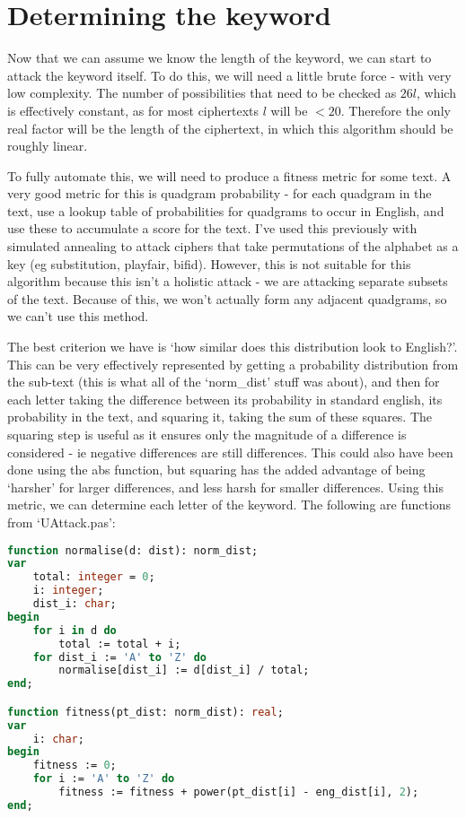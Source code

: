 \documentclass[fleqn,a4paper,11pt]{article}
\begin{document}
    \section{Determining the keyword}

    Now that we can assume we know the length of the keyword, we can start to
    attack the keyword itself. To do this, we will need a little brute force -
    with very low complexity. The number of possibilities that need to be
    checked as \(26l\), which is effectively constant, as for most ciphertexts
    \(l\) will be \(< 20\). Therefore the only real factor will be the length of
    the ciphertext, in which this algorithm should be roughly linear.

    To fully automate this, we will need to produce a fitness metric for some
    text. A very good metric for this is quadgram probability - for each
    quadgram in the text, use a lookup table of probabilities for quadgrams to
    occur in English, and use these to accumulate a score for the text. I've
    used this previously with simulated annealing to attack ciphers that take
    permutations of the alphabet as a key (eg substitution, playfair, bifid).
    However, this is not suitable for this algorithm because this isn't a
    holistic attack - we are attacking separate subsets of the text. Because of
    this, we won't actually form any adjacent quadgrams, so we can't use this
    method.

    The best criterion we have is `how similar does this distribution look to
    English?'. This can be very effectively represented by getting a
    probability distribution from the sub-text (this is what all of the
    `norm\_dist' stuff was about), and then for each letter taking the
    difference between its probability in standard english, its probability in
    the text, and squaring it, taking the sum of these squares. The squaring
    step is useful as it ensures only the magnitude of a difference is
    considered - ie negative differences are still differences. This could also
    have been done using the abs function, but squaring has the added advantage
    of being `harsher' for larger differences, and less harsh for smaller
    differences. Using this metric, we can determine each letter of the
    keyword. The following are functions from `UAttack.pas':

\begin{lstlisting}[language=Pascal, caption=Fitness library functions]
function normalise(d: dist): norm_dist;
var
    total: integer = 0;
    i: integer;
    dist_i: char;
begin
    for i in d do
        total := total + i;
    for dist_i := 'A' to 'Z' do
        normalise[dist_i] := d[dist_i] / total;
end;

function fitness(pt_dist: norm_dist): real;
var
    i: char;
begin
    fitness := 0;
    for i := 'A' to 'Z' do
        fitness := fitness + power(pt_dist[i] - eng_dist[i], 2);
end;
\end{lstlisting}
\end{document}
